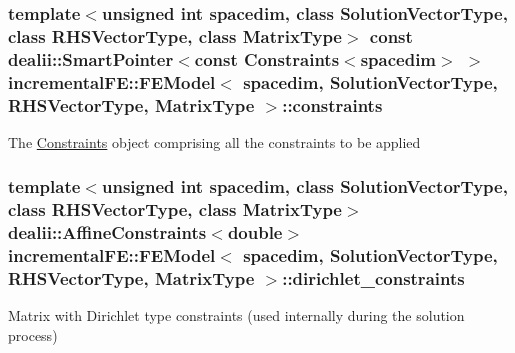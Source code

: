 \subsubsection[{\texorpdfstring{constraints}{constraints}}]{\setlength{\rightskip}{0pt plus 5cm}template$<$unsigned int spacedim, class Solution\+Vector\+Type, class R\+H\+S\+Vector\+Type, class Matrix\+Type$>$ const dealii\+::\+Smart\+Pointer$<$const {\bf Constraints}$<$spacedim$>$ $>$ {\bf incremental\+F\+E\+::\+F\+E\+Model}$<$ spacedim, Solution\+Vector\+Type, R\+H\+S\+Vector\+Type, Matrix\+Type $>$\+::constraints\hspace{0.3cm}{\ttfamily [private]}}\hypertarget{classincremental_f_e_1_1_f_e_model_a33a622c3c53ea4bee3bdefac06201c70}{}\label{classincremental_f_e_1_1_f_e_model_a33a622c3c53ea4bee3bdefac06201c70}
The \hyperlink{classincremental_f_e_1_1_constraints}{Constraints} object comprising all the constraints to be applied 
\subsubsection[{\texorpdfstring{dirichlet\+\_\+constraints}{dirichlet_constraints}}]{\setlength{\rightskip}{0pt plus 5cm}template$<$unsigned int spacedim, class Solution\+Vector\+Type, class R\+H\+S\+Vector\+Type, class Matrix\+Type$>$ dealii\+::\+Affine\+Constraints$<$double$>$ {\bf incremental\+F\+E\+::\+F\+E\+Model}$<$ spacedim, Solution\+Vector\+Type, R\+H\+S\+Vector\+Type, Matrix\+Type $>$\+::dirichlet\+\_\+constraints\hspace{0.3cm}{\ttfamily [private]}}\hypertarget{classincremental_f_e_1_1_f_e_model_a4ea39622157334a3d985c418a3b9ca34}{}\label{classincremental_f_e_1_1_f_e_model_a4ea39622157334a3d985c418a3b9ca34}
Matrix with Dirichlet type constraints (used internally during the solution process) 
